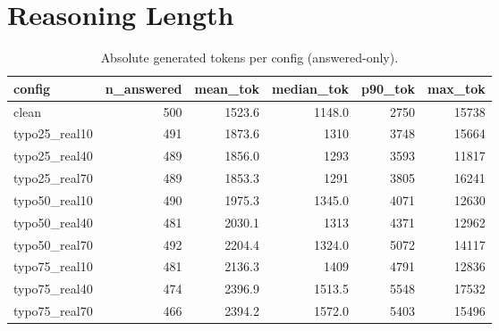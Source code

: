 \documentclass[11pt]{article}
\begin{document}
\section*{Reasoning Length}
\begin{table}[H]
\centering
\caption{Absolute generated tokens per config (answered-only).}
\small
\begin{adjustbox}{max width=\textwidth}
\begin{tabular}{lrrrrr}
\toprule
\textbf{config} & \textbf{n\_answered} & \textbf{mean\_tok} & \textbf{median\_tok} & \textbf{p90\_tok} & \textbf{max\_tok} \\
\midrule
clean & 500 & 1523.6 & 1148.0 & 2750 & 15738 \\
typo25\_real10 & 491 & 1873.6 & 1310 & 3748 & 15664 \\
typo25\_real40 & 489 & 1856.0 & 1293 & 3593 & 11817 \\
typo25\_real70 & 489 & 1853.3 & 1291 & 3805 & 16241 \\
typo50\_real10 & 490 & 1975.3 & 1345.0 & 4071 & 12630 \\
typo50\_real40 & 481 & 2030.1 & 1313 & 4371 & 12962 \\
typo50\_real70 & 492 & 2204.4 & 1324.0 & 5072 & 14117 \\
typo75\_real10 & 481 & 2136.3 & 1409 & 4791 & 12836 \\
typo75\_real40 & 474 & 2396.9 & 1513.5 & 5548 & 17532 \\
typo75\_real70 & 466 & 2394.2 & 1572.0 & 5403 & 15496 \\
\bottomrule
\end{tabular}
\end{adjustbox}
\end{table}
\end{document}
